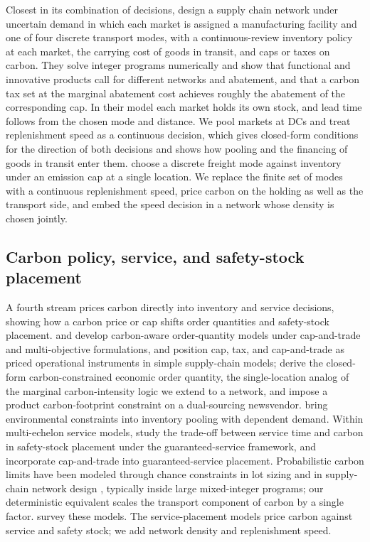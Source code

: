 \documentclass[11pt]{article}
\numberwithin{proposition}{section}
\theoremstyle{definition}
\theoremstyle{remark}
\theoremstyle{plain}
\begin{document}
Closest in its combination of decisions, \citet{comasmarti2015carbon} design a supply chain network under
uncertain demand in which each market is assigned a manufacturing facility and one of four discrete transport
modes, with a continuous-review inventory policy at each market, the carrying cost of goods in transit, and caps
or taxes on carbon. They solve integer programs numerically and show that functional and innovative products call
for different networks and abatement, and that a carbon tax set at the marginal abatement cost achieves roughly
the abatement of the corresponding cap. In their model each market holds its own stock, and lead time follows from
the chosen mode and distance. We pool markets at DCs and treat replenishment speed as a
continuous decision, which gives closed-form conditions for the direction of both decisions and shows how pooling
and the financing of goods in transit enter them.
\citet{boone2025freight} choose a discrete freight mode against inventory under an emission cap at a single
location. We replace the finite set of modes with a continuous replenishment speed, price carbon on the holding
as well as the transport side, and embed the speed decision in a network whose density is chosen jointly.

\subsection{Carbon policy, service, and safety-stock placement}

A fourth stream prices carbon directly into inventory and service decisions, showing how a carbon price or cap
shifts order quantities and safety-stock placement.
\citet{hua2011managing} and \citet{bouchery2012including} develop carbon-aware order-quantity models under
cap-and-trade and multi-objective formulations, and \citet{benjaafar2013carbon} position cap, tax, and
cap-and-trade as priced operational instruments in simple supply-chain models; \citet{chen2013carbon} derive the
closed-form carbon-constrained economic order quantity, the single-location analog of the marginal
carbon-intensity logic we extend to a network, and \citet{arikan2014single} impose a product carbon-footprint
constraint on a dual-sourcing newsvendor. \citet{silbermayr2017inventory} bring environmental constraints into
inventory pooling with dependent demand. Within multi-echelon service models,
\citet{ni2015tradeoff} study the trade-off between service time and carbon in safety-stock placement under the
guaranteed-service framework, and \citet{wang2025inventory} incorporate cap-and-trade into guaranteed-service
placement. Probabilistic carbon limits have been modeled through chance constraints in lot sizing
\citep{koca2021stochastic} and in supply-chain network design \citep{shaw2016low}, typically inside large
mixed-integer programs; our deterministic equivalent scales the transport component of carbon by a single factor. \citet{sebatjane2025sustainable} survey these models. The service-placement models price carbon against service and
safety stock; we add network density and replenishment speed. 
\end{document}
